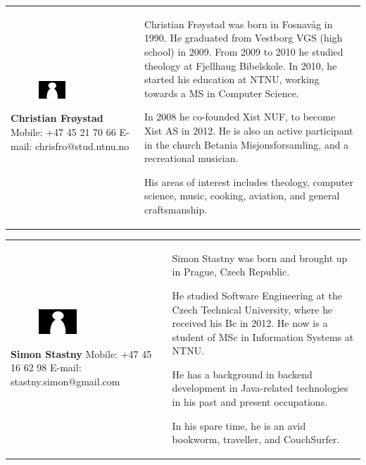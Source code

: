 \documentclass[11pt]{book}
\begin{document}
\begin{table}[H]
\centering
\begin{tabular}{ p{7cm} p{7cm} }
\parbox{7cm}{
\begin{figure}[H]
      \includegraphics[width=0.4\textwidth]{Figures/Person.png}
      \label{fig:partners_group_christian}
\end{figure}
\textbf{Christian Frøystad}\\
Mobile: +47 45 21 70 66\\
E-mail: chrisfro@stud.ntnu.no} & \parbox{7cm}{
Christian Frøystad was born in Fosnavåg in 1990. He graduated from Vestborg VGS (high school) in 2009. From 2009 to 2010 he studied theology at Fjellhaug Bibelskole.
In 2010, he started his education at NTNU, working towards a MS in Computer Science.

In 2008 he co-founded Xist NUF, to become Xist AS in 2012.
He is also an active participant in the church Betania Misjonsforsamling, and a recreational musician.

His areas of interest includes theology, computer science, music, cooking, aviation, and general craftsmanship.
}
\end{tabular}
\label{tab:partners_group_christian}
\end{table}

\begin{table}[H]
\centering
\begin{tabular}{ p{7cm} p{7cm} }
\parbox{7cm}{
\begin{figure}[H]
      \includegraphics[width=0.4\textwidth]{Figures/Person.png}
      \label{fig:partners_group_simon}
\end{figure}
\textbf{Simon Stastny}\\
Mobile: +47 45 16 62 98\\
E-mail: stastny.simon@gmail.com} & \parbox{7cm}{
    
Simon Stastny was born and brought up in Prague, Czech Republic.

He studied Software Engineering at the Czech Technical University, where he received his Bc in 2012. He now is a student of MSc in Information Systems at NTNU.

He has a background in backend development in Java-related technologies in his past and present occupations.

In his spare time, he is an avid bookworm, traveller, and CouchSurfer.
}
\end{tabular}
\label{tab:partners_group_simon}
\end{table}
\end{document}
